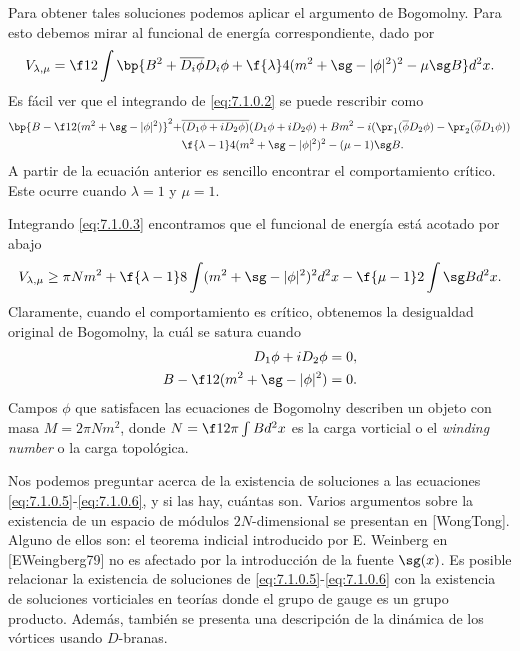 Para obtener tales soluciones podemos aplicar el argumento de Bogomolny. Para esto debemos mirar al funcional de energía correspondiente, dado por
\begin{align}
	V_{\lambda,\mu} = \f 12\int\bp{B^2+\overline{D_i\phi}D_i\phi+\f{\lambda}4(m^2+\sg-|\phi|^2)^2-\mu\sg B}d^2x. \label{eq:7.1.0.2}
\end{align}
Es fácil ver que el integrando de \eqref{eq:7.1.0.2} se puede rescribir como
\begin{align}
	\bp{B-\f 12(m^2+\sg-|\phi|^2)}^2+&\overline{(D_1\phi+iD_2\phi)}(D_1\phi+iD_2\phi)+Bm^2-i(\pr_1(\overline\phi D_2\phi)-\pr_2(\overline\phi D_1\phi))\nonumber\\
	&\f{\lambda-1}4(m^2+\sg-|\phi|^2)^2-(\mu-1)\sg B. \label{eq:7.1.0.3}
\end{align}
A partir de la ecuación anterior es sencillo encontrar el comportamiento crítico. Este ocurre cuando $\lambda=1$ y $\mu=1$.

Integrando \eqref{eq:7.1.0.3} encontramos que el funcional de energía está acotado por abajo
\begin{align}
	V_{\lambda,\mu}\geq \pi Nm^2+\f{\lambda-1}8\int (m^2+\sg-|\phi|^2)^2d^2x-\f{\mu-1}2\int\sg Bd^2x.
\end{align} 
Claramente, cuando el comportamiento es crítico, obtenemos la desigualdad original de Bogomolny, la cuál se satura cuando
\begin{align}
	D_1\phi+iD_2\phi &=0, \label{eq:7.1.0.5}\\ 
	B-\f 12(m^2+\sg-|\phi|^2) &=0. \label{eq:7.1.0.6}
\end{align}
Campos $\phi$ que satisfacen las ecuaciones de Bogomolny describen un objeto con masa $M=2\pi Nm^2$, donde $N=\f 1{2\pi}\int B d^2x$ es la carga vorticial o el \emph{winding number} o la carga topológica.

Nos podemos preguntar acerca de la existencia de soluciones a las ecuaciones \eqref{eq:7.1.0.5}-\eqref{eq:7.1.0.6}, y si las hay, cuántas son. Varios argumentos sobre la existencia de un espacio de módulos $2N$-dimensional se presentan en [WongTong]. Alguno de ellos son: el teorema indicial introducido por E. Weinberg en [EWeingberg79] no es afectado por la introducción de la fuente $\sg(x)$. Es posible relacionar la existencia de soluciones de \eqref{eq:7.1.0.5}-\eqref{eq:7.1.0.6} con la existencia de soluciones vorticiales en teorías donde el grupo de gauge es un grupo producto. Además, también se presenta una descripción de la dinámica de los vórtices usando $D$-branas.

